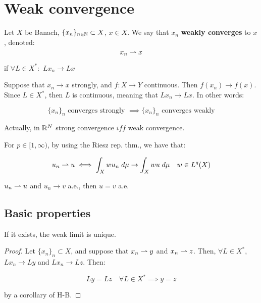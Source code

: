 \chapter{Weak convergence}

\begin{fdefinition}
    Let $X$ be Banach, $\{x_n\}_{n \in \mathbb{N}} \subset X$, $x \in X$. We say that
    $x_n$ \textbf{weakly converges} to $x$, denoted:
    $$x_n \rightharpoonup x$$

    if $\forall L \in X^*:$ $L x_n \to Lx$ 

\end{fdefinition}

\begin{fremark}
    Suppose that $x_n \to x$ strongly, and $f: X \to Y$ continuous. Then
    $f(x_n) \to f(x)$. Since $L \in X^*$, then $L$ is continuous, meaning
    that $Lx_n \to Lx$. In other words:

    $$\{x_n\}_n \text{ converges strongly } \implies \{x_n\}_n \text{ converges weakly}$$

    Actually, in $\mathbb{R}^N$ strong convergence $iff$ weak convergence.
\end{fremark}

\begin{fremark}
    For $p \in [1, \infty)$, by using the Riesz rep. thm., we have that:

    $$u_n \rightharpoonup u \iff \int_X w u_n \; d\mu \to \int_X w u \; d \mu \quad w \in L^q(X)$$
\end{fremark}

\vspace{1em}

\begin{fproposition}
    $u_n \rightharpoonup u$ and $u_n \to v$ a.e., then $u = v$ a.e.
\end{fproposition}

\section{Basic properties}

\begin{fproposition}
    If it exists, the weak limit is unique.
\end{fproposition}

\begin{proof}
    Let $\{x_n\}_n \subset X$, and suppose that $x_n \rightharpoonup y$ and $x_n \rightharpoonup z$.
    Then, $\forall L \in X^*$, $Lx_n \to Ly$ and $Lx_n \to Lz$. Then:

    $$Ly = Lz \quad \forall L \in X^* \implies y = z$$

    by a corollary of H-B.

\end{proof}

